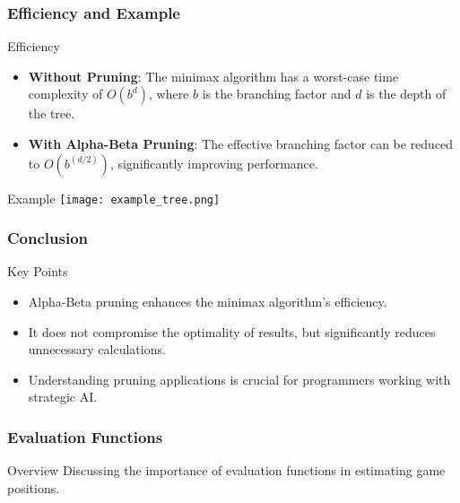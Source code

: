 \documentclass[aspectratio=169]{beamer}
\begin{document}
\begin{frame}[fragile]
    \frametitle{Efficiency and Example}
    \begin{block}{Efficiency}
        \begin{itemize}
            \item \textbf{Without Pruning}: The minimax algorithm has a worst-case time complexity of $O(b^d)$, where $b$ is the branching factor and $d$ is the depth of the tree.
            \item \textbf{With Alpha-Beta Pruning}: The effective branching factor can be reduced to $O(b^{(d/2)})$, significantly improving performance.
        \end{itemize}
    \end{block}

    \begin{block}{Example}
        \texttt{[image: example\_tree.png]} %
    \end{block}
\end{frame}

\begin{frame}[fragile]
    \frametitle{Conclusion}
    \begin{block}{Key Points}
        \begin{itemize}
            \item Alpha-Beta pruning enhances the minimax algorithm's efficiency.
            \item It does not compromise the optimality of results, but significantly reduces unnecessary calculations.
            \item Understanding pruning applications is crucial for programmers working with strategic AI.
        \end{itemize}
    \end{block}
\end{frame}

\begin{frame}
  \frametitle{Evaluation Functions}
  \begin{block}{Overview}
    Discussing the importance of evaluation functions in estimating game positions.
  \end{block}
\end{frame}
\end{document}
